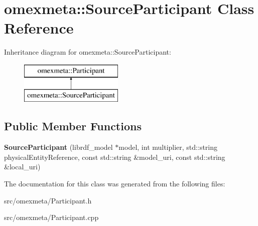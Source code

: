 \hypertarget{classomexmeta_1_1SourceParticipant}{}\section{omexmeta\+:\+:Source\+Participant Class Reference}
\label{classomexmeta_1_1SourceParticipant}
Inheritance diagram for omexmeta\+:\+:Source\+Participant\+:\begin{figure}[H]
\begin{center}
\leavevmode
\includegraphics[height=2.000000cm]{classomexmeta_1_1SourceParticipant}
\end{center}
\end{figure}
\subsection*{Public Member Functions}
\begin{DoxyCompactItemize}
\item 
\mbox{\label{classomexmeta_1_1SourceParticipant_a84b77b854e235cc9e0cb8da2b6a2cee5}} 
{\bfseries Source\+Participant} (librdf\+\_\+model $\ast$model, int multiplier, std\+::string physical\+Entity\+Reference, const std\+::string \&model\+\_\+uri, const std\+::string \&local\+\_\+uri)
\end{DoxyCompactItemize}


The documentation for this class was generated from the following files\+:\begin{DoxyCompactItemize}
\item 
src/omexmeta/Participant.\+h\item 
src/omexmeta/Participant.\+cpp\end{DoxyCompactItemize}
